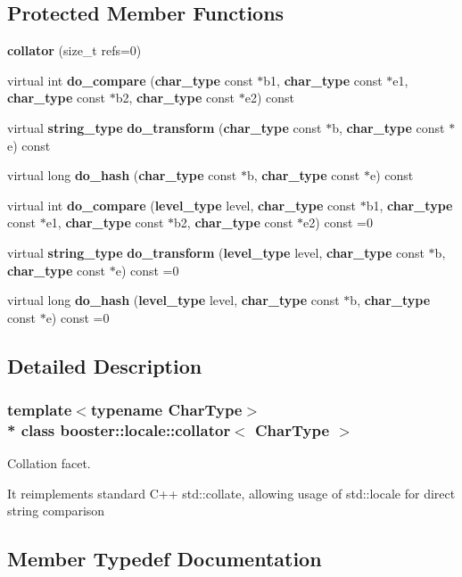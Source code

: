 \subsection*{Protected Member Functions}
\begin{DoxyCompactItemize}
\item 
{\bf collator} (size\+\_\+t refs=0)
\item 
virtual int {\bf do\+\_\+compare} ({\bf char\+\_\+type} const $\ast$b1, {\bf char\+\_\+type} const $\ast$e1, {\bf char\+\_\+type} const $\ast$b2, {\bf char\+\_\+type} const $\ast$e2) const 
\item 
virtual {\bf string\+\_\+type} {\bf do\+\_\+transform} ({\bf char\+\_\+type} const $\ast$b, {\bf char\+\_\+type} const $\ast$e) const 
\item 
virtual long {\bf do\+\_\+hash} ({\bf char\+\_\+type} const $\ast$b, {\bf char\+\_\+type} const $\ast$e) const 
\item 
virtual int {\bf do\+\_\+compare} ({\bf level\+\_\+type} level, {\bf char\+\_\+type} const $\ast$b1, {\bf char\+\_\+type} const $\ast$e1, {\bf char\+\_\+type} const $\ast$b2, {\bf char\+\_\+type} const $\ast$e2) const =0
\item 
virtual {\bf string\+\_\+type} {\bf do\+\_\+transform} ({\bf level\+\_\+type} level, {\bf char\+\_\+type} const $\ast$b, {\bf char\+\_\+type} const $\ast$e) const =0
\item 
virtual long {\bf do\+\_\+hash} ({\bf level\+\_\+type} level, {\bf char\+\_\+type} const $\ast$b, {\bf char\+\_\+type} const $\ast$e) const =0
\end{DoxyCompactItemize}


\subsection{Detailed Description}
\subsubsection*{template$<$typename Char\+Type$>$\\*
class booster\+::locale\+::collator$<$ Char\+Type $>$}

Collation facet. 

It reimplements standard C++ std\+::collate, allowing usage of std\+::locale for direct string comparison 

\subsection{Member Typedef Documentation}
